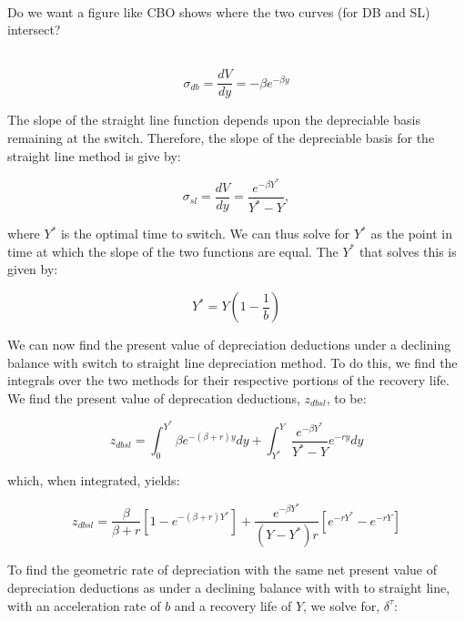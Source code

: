 \documentclass[article,11pt,letterpaper,fleqn]{article}
\theoremstyle{definition}
\numberwithin{equation}{section}
\begin{document}
\ \\
\begin{center}
Do we want a figure like CBO shows where the two curves (for DB and SL) intersect?
\end{center}
\ \\

\begin{equation}
\sigma_{db} = \frac{dV}{dy}=-\beta e^{-\beta y}
\end{equation}

\noindent\noindent The slope of the straight line function depends upon the depreciable basis remaining at the switch.  Therefore, the slope of the depreciable basis for the straight line method is give by:

\begin{equation}
\sigma_{sl} =  \frac{dV}{dy}=\frac{e^{-\beta Y^{*}}}{Y^{*}-Y},
\end{equation}

\noindent\noindent where $Y^{*}$ is the optimal time to switch. We can thus solve for $Y^{*}$ as the point in time at which the slope of the two functions are equal.  The $Y^{*}$ that solves this is given by:

\begin{equation}
Y^{*}=Y\left(1-\frac{1}{b}\right)
\end{equation}

We can now find the present value of depreciation deductions under a declining balance with switch to straight line depreciation method.  To do this, we find the integrals over the two methods for their respective portions of the recovery life.  We find the present value of deprecation deductions, $z_{dbsl}$, to be:

\begin{equation}
z_{dbsl}=\int_{0}^{Y^{*}}\beta e^{-(\beta+r)y}dy+\int_{Y^{*}}^{Y}\frac{e^{-\beta Y^{*}}}{Y^{*}-Y}e^{-ry}dy
\end{equation}

\noindent\noindent which, when integrated, yields:

\begin{equation}
z_{dbsl}=\frac{\beta}{\beta+r}\left[1-e^{-(\beta+r)Y^{*}}\right]+\frac{e^{-\beta Y^{*}}}{(Y-Y^{*})r}\left[e^{-rY^{*}}-e^{-rY}\right]
\end{equation}

\noindent\noindent To find the geometric rate of depreciation with the same net present value of depreciation deductions as under a declining balance with with to straight line, with an acceleration rate of $b$ and a recovery life of $Y$, we solve for, $\delta^{\tau}$:
\end{document}
